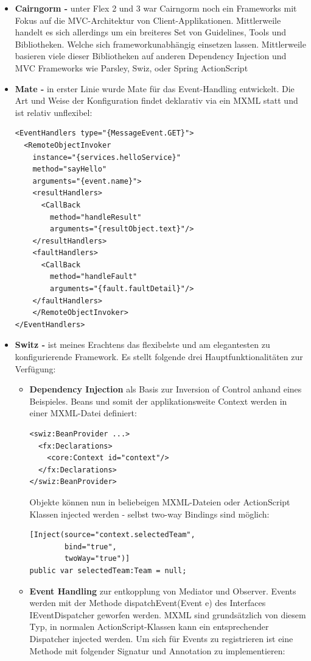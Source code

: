 \begin{itemize}
\item \textbf{Cairngorm\cite{Cairngorm} - } unter Flex 2 und 3 war Cairngorm noch ein Frameworks mit Fokus auf die MVC-Architektur von Client-Applikationen. Mittlerweile handelt es sich allerdings um ein breiteres Set von Guidelines, Tools und Bibliotheken. Welche sich frameworkunabh\"angig einsetzen lassen. Mittlerweile basieren viele dieser Bibliotheken auf anderen Dependency Injection und MVC Frameworks wie Parsley, Swiz, oder Spring ActionScript
\item \textbf{Mate\cite{Mate} - } in erster Linie wurde Mate f\"ur das Event-Handling entwickelt. Die Art und Weise der Konfiguration findet deklarativ via ein MXML statt und ist relativ unflexibel:

\begin{lstlisting}[caption=Event-Deklaration mit dem Mate Framework]
<EventHandlers type="{MessageEvent.GET}">
  <RemoteObjectInvoker 
    instance="{services.helloService}" 
    method="sayHello" 
    arguments="{event.name}">
    <resultHandlers>
      <CallBack 
        method="handleResult" 
        arguments="{resultObject.text}"/>
    </resultHandlers>
    <faultHandlers>
      <CallBack 
        method="handleFault" 
        arguments="{fault.faultDetail}"/>
    </faultHandlers>
    </RemoteObjectInvoker>
</EventHandlers>
\end{lstlisting}

\item \textbf{Switz\cite{Swiz} - }ist meines Erachtens das flexibelste und am elegantesten zu konfigurierende Framework. Es stellt folgende drei Hauptfunktionalit\"aten zur Verf\"ugung:
\begin{itemize}
	\item \textbf{Dependency Injection} als Basis zur Inversion of Control anhand eines Beispieles. Beans und somit der applikationsweite Context werden in einer MXML-Datei definiert:
\begin{lstlisting}[caption=Swiz: Bean Deklaration]
<swiz:BeanProvider ...>
  <fx:Declarations>
    <core:Context id="context"/>
  </fx:Declarations>
</swiz:BeanProvider>
\end{lstlisting}

Objekte k\"onnen nun in beliebeigen MXML-Dateien oder ActionScript Klassen injected werden - selbst two-way Bindings sind m\"oglich:
\begin{lstlisting}[caption=Swiz: Bean Injection]
[Inject(source="context.selectedTeam", 
        bind="true",
        twoWay="true")]
public var selectedTeam:Team = null;
\end{lstlisting}
\item \textbf{Event Handling} zur entkopplung von Mediator und Observer. Events werden mit der Methode dispatchEvent(Event e) des Interfaces IEventDispatcher geworfen werden. MXML sind grunds\"atzlich von diesem Typ, in normalen ActionScript-Klassen kann ein entsprechender Dispatcher injected werden. Um sich f\"ur Events zu registrieren ist eine Methode mit folgender Signatur und Annotation zu implementieren:


\end{itemize}
\end{itemize}
